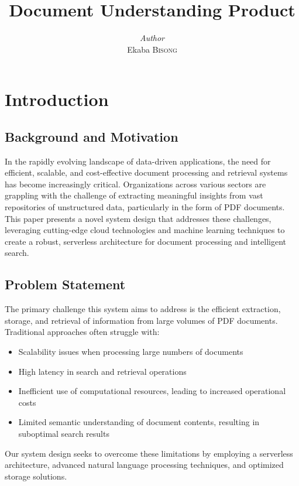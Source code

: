 \documentclass[a4paper, 12pt]{report}
\title{Document Understanding Product}
\author{\textit{Author}\\Ekaba \textsc{Bisong}}
\date{}
\begin{document}
\maketitle
\romantableofcontents



\chapter{Introduction}

\section{Background and Motivation}
In the rapidly evolving landscape of data-driven applications, the need for efficient, scalable, and cost-effective document processing and retrieval systems has become increasingly critical. Organizations across various sectors are grappling with the challenge of extracting meaningful insights from vast repositories of unstructured data, particularly in the form of PDF documents. This paper presents a novel system design that addresses these challenges, leveraging cutting-edge cloud technologies and machine learning techniques to create a robust, serverless architecture for document processing and intelligent search.

\section{Problem Statement}
The primary challenge this system aims to address is the efficient extraction, storage, and retrieval of information from large volumes of PDF documents. Traditional approaches often struggle with:
\begin{itemize}
    \item Scalability issues when processing large numbers of documents
    \item High latency in search and retrieval operations
    \item Inefficient use of computational resources, leading to increased operational costs
    \item Limited semantic understanding of document contents, resulting in suboptimal search results
\end{itemize}
Our system design seeks to overcome these limitations by employing a serverless architecture, advanced natural language processing techniques, and optimized storage solutions.
\end{document}
